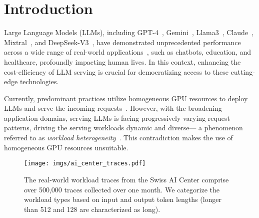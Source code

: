 \section{Introduction}
\label{sec:intro}






Large Language Models (LLMs), including GPT-4~\cite{gpt4o}, Gemini~\cite{reid2024gemini}, Llama3~\cite{dubey2024llama}, Claude~\cite{claude3}, Mixtral~\cite{jiang2024mixtral}, and DeepSeek-V3~\cite{deepseek_v3}, have demonstrated unprecedented performance across a wide range of real-world applications~\cite{copilot,jeon2023large,peng2023study}, such as chatbots, education, and healthcare, profoundly impacting human lives. In this context, enhancing the cost-efficiency of LLM serving is crucial for democratizing access to these cutting-edge technologies.

Currently, predominant practices utilize homogeneous GPU resources to deploy LLMs and serve the incoming requests~\cite{li2023alpaserve,kwon2023efficient,agrawal2024taming}. 
However, with the broadening application domains, serving LLMs is facing progressively varying request patterns, driving the serving workloads dynamic and diverse--- a phenomenon referred to as \textit{workload heterogeneity}~\cite{sun2024llumnix,zhao2024blendserve}.
This contradiction makes the use of homogeneous GPU resources unsuitable. 

\begin{figure}[!t]
    \centering
    \texttt{[image: imgs/ai\_center\_traces.pdf]}
    \caption{\small{The real-world workload traces from the Swiss AI Center comprise over 500,000 traces collected over one month. We categorize the workload types based on input and output token lengths (longer than 512 and 128 are characterized as long).}}
    \vspace{-1em}
    \label{fig:req trace}
\end{figure}

